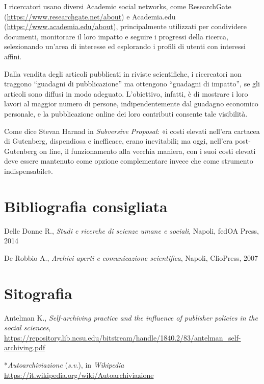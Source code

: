 \documentclass[
  b5paper,
  twoside,
  12pt,
  chapterprefix=false,
  bibliography=totocnumbered,
  parskip=false]{scrbook}
\begin{document}
I ricercatori usano diversi Academic social networks, come ResearchGate
(\url{https://www.researchgate.net/about})
e Academia.edu
(\url{https://www.academia.edu/about}),
principalmente utilizzati per condividere documenti, monitorare il loro
impatto e seguire i progressi della ricerca, selezionando un'area di
interesse ed esplorando i profili di utenti con interessi affini.

Dalla vendita degli articoli pubblicati in riviste scientifiche, i
ricercatori non traggono \enquote{guadagni di pubblicazione} ma ottengono
\enquote{guadagni di impatto}, se gli articoli sono diffusi in modo adeguato.
L'obiettivo, infatti, è di mostrare i loro lavori al maggior numero di
persone, indipendentemente dal guadagno economico personale, e la
pubblicazione online dei loro contributi consente tale visibilità.

Come dice Stevan Harnad in \emph{Subversive} \emph{Proposal}: «i costi elevati
nell'era cartacea di Gutenberg, dispendiosa e inefficace, erano
inevitabili; ma oggi, nell'era post-Gutenberg on line, il funzionamento
alla vecchia maniera, con i suoi costi elevati deve essere mantenuto
come opzione complementare invece che come strumento indispensabile».

\hypertarget{bibliografia-consigliata-22}{%
\section*{Bibliografia consigliata}\label{bibliografia-consigliata-22}}

Delle Donne R., \emph{Studi e ricerche di scienze umane e sociali}, Napoli,
fedOA Press, 2014

De Robbio A., \emph{Archivi aperti e comunicazione scientifica}, Napoli,
ClioPress, 2007

\hypertarget{sitografia-29}{%
\section*{Sitografia}\label{sitografia-29}}

Antelman K., \emph{Self-archiving practice and the influence of publisher
policies in the social sciences},
\url{https://repository.lib.ncsu.edu/bitstream/handle/1840.2/83/antelman_self-archiving.pdf}

*\emph{Autoarchiviazione} (\emph{s.v}.), in \emph{Wikipedia}
\url{https://it.wikipedia.org/wiki/Autoarchiviazione}
\end{document}
